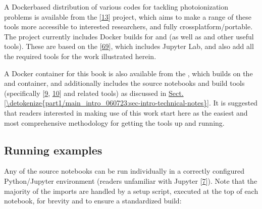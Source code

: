 \documentclass[letterpaper,table,10pt,english]{jupyterBook}
\begin{document}
\sphinxAtStartPar
A Docker\sphinxhyphen{}based distribution of various codes for tackling
photoionization problems is available from the  {[}\hyperlink{cite.backmatter/bibliography:id671}{13}{]}
project, which aims to make a range of these tools more accessible to
interested researchers, and fully cross\sphinxhyphen{}platform/portable. The project currently includes Docker builds for  and  (as well as  and other useful tools). These are based on the  {[}\hyperlink{cite.backmatter/bibliography:id696}{69}{]}, which includes Jupyter Lab, and also add all the required tools for the work illustrated herein.

\sphinxAtStartPar
A Docker container for this book is also available from the , which builds on the  and  container, and additionally includes the source notebooks and build tools (specifically  {[}\hyperlink{cite.backmatter/bibliography:id695}{9}, \hyperlink{cite.backmatter/bibliography:id556}{10}{]} and related tools) as discussed in  \hyperref[\detokenize{part1/main_intro_060723:sec-intro-technical-notes}]{Sect.\@ \ref{\detokenize{part1/main_intro_060723:sec-intro-technical-notes}}}. It is suggested that readers interested in making use of this work start here as the easiest \sphinxhyphen{} and most comprehensive \sphinxhyphen{} methodology for getting the tools up and running.


\subsection{Running examples}
\label{\detokenize{part1/platform_intro_070723:running-examples}}
\sphinxAtStartPar
Any of the source notebooks can be run individually in a correctly configured Python/Jupyter environment (readers unfamiliar with Jupyter  {[}\hyperlink{cite.backmatter/bibliography:id809}{7}{]}). Note that the majority of the imports are handled by a setup script, executed at the top of each notebook, for brevity and to ensure a standardized build:
\end{document}
